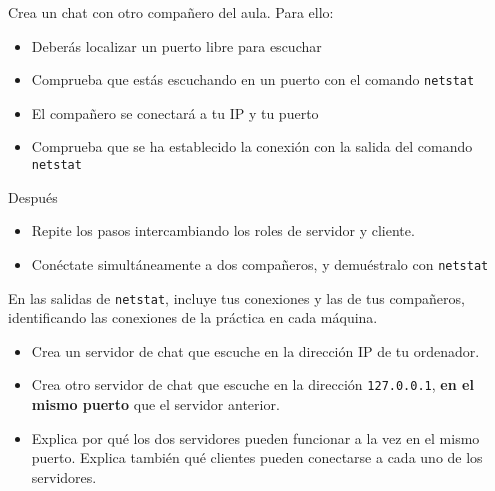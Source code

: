 \begin{homeworkProblem}
  Crea un chat con otro compañero del aula. Para ello:
  \begin{itemize}
  \item Deberás localizar un puerto libre para escuchar
  \item Comprueba que estás escuchando en un puerto con el comando \texttt{netstat}
  \item El compañero se conectará a tu IP y tu puerto
  \item Comprueba que se ha establecido la conexión con la salida del comando \texttt{netstat}
  \end{itemize}

  Después
  \begin{itemize}
  \item Repite los pasos intercambiando los roles de servidor y cliente.
  \item Conéctate simultáneamente a dos compañeros, y demuéstralo con \texttt{netstat}
  \end{itemize}

  En las salidas de \texttt{netstat}, incluye tus conexiones y las de tus compañeros, identificando las conexiones de la práctica en cada máquina.
\end{homeworkProblem}

\begin{homeworkProblem}
  \begin{itemize}
  \item Crea un servidor de chat que escuche en la dirección IP de tu ordenador.
  \item Crea otro servidor de chat que escuche en la dirección \texttt{127.0.0.1}, \textbf{en el mismo puerto} que el servidor anterior.
  \item Explica por qué los dos servidores pueden funcionar a la vez en el mismo puerto. Explica también qué clientes pueden conectarse a cada uno de los servidores.
\end{itemize}
\end{homeworkProblem}



